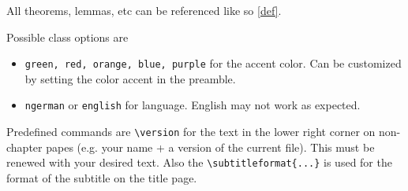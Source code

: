 \documentclass[red, english]{skript}
\begin{document}
All theorems, lemmas, etc can be referenced like so \autoref{def}.

Possible class options are
\begin{itemize}
	\item \texttt{green, red, orange, blue, purple} for the accent color. Can be customized by setting the color accent in the preamble.
	\item \texttt{ngerman} or \texttt{english} for language. English may not work as expected.
\end{itemize}
Predefined commands are \texttt{\textbackslash version} for the text in the lower right corner on non-chapter papes (e.g. your name + a version of the current file). This must be renewed with your desired text.
Also the \texttt{\textbackslash subtitleformat\{...\}} is used for the format of the subtitle on the title page.
\end{document}
